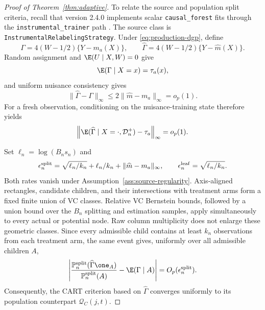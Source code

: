 \begin{appendix}
\begin{proof}[Proof of Theorem~\ref{thm:adaptive}]
To relate the source and population split criteria, recall that version 2.4.0
implements scalar \nolinkurl{causal_forest} fits through the
\nolinkurl{instrumental_trainer} path \citep{grfsource240}. The source class is
\nolinkurl{InstrumentalRelabelingStrategy}. Under \eqref{eq:production-dgp},
define
\[
\Gamma=4(W-1/2)\{Y-m_a(X)\},
\qquad
\widehat\Gamma=4(W-1/2)\{Y-\widehat m(X)\}.
\]
Random assignment and \(\E(U\mid X,W)=0\) give
\begin{equation}\label{eq:app-gamma-mean}
\E(\Gamma\mid X=x)=\tau_a(x),
\end{equation}
and uniform nuisance consistency gives
\begin{equation}\label{eq:app-score-nuisance}
\|\widehat\Gamma-\Gamma\|_\infty
\le2\|\widehat m-m_a\|_\infty=o_p(1).
\end{equation}
For a fresh observation, conditioning on the nuisance-training state therefore
yields
\begin{equation}\label{eq:app-conditional-score-mean}
\left\|\E(\widehat\Gamma\mid X=\cdot,\mathcal D_n^+)-\tau_a\right\|_\infty
=o_p(1).
\end{equation}

Set \(\ell_n=\log(B_ns_n)\) and
\[
\epsilon_n^{\rm split}
=\sqrt{\ell_n/k_n}+\ell_n/k_n+\|\widehat m-m_a\|_\infty,
\qquad
\epsilon_n^{\rm leaf}=\sqrt{\ell_n/k_n}.
\]
Both rates vanish under Assumption~\ref{ass:source-regularity}. Axis-aligned
rectangles, candidate children, and their intersections with treatment arms
form a fixed finite union of VC classes. Relative VC Bernstein bounds, followed
by a union bound over the \(B_n\) splitting and estimation samples, apply
simultaneously to every actual or potential node. Raw column multiplicity does
not enlarge these geometric classes. Since every admissible child contains at
least \(k_n\) observations from each treatment arm, the same event gives,
uniformly over all admissible children \(A\),
\[
\left|
\frac{\mathbb P_n^{\rm split}(\widehat\Gamma\one_A)}
{\mathbb P_n^{\rm split}(A)}-\E(\Gamma\mid A)
\right|=O_p(\epsilon_n^{\rm split}).
\]
Consequently, the CART criterion based on \(\widehat\Gamma\) converges uniformly
to its population counterpart \(\mathcal Q_C(j,t)\).


\end{proof}
\end{appendix}
